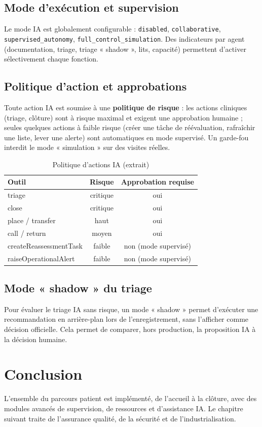 \subsection{Mode d'exécution et supervision}

Le mode IA est globalement configurable : \texttt{disabled}, \texttt{collaborative}, \texttt{supervised\_autonomy}, \texttt{full\_control\_simulation}. Des indicateurs par agent (documentation, triage, triage « shadow », lits, capacité) permettent d'activer sélectivement chaque fonction.

\subsection{Politique d'action et approbations}

Toute action IA est soumise à une \textbf{politique de risque} : les actions cliniques (triage, clôture) sont à risque maximal et exigent une approbation humaine ; seules quelques actions à faible risque (créer une tâche de réévaluation, rafraîchir une liste, lever une alerte) sont automatiques en mode supervisé. Un garde-fou interdit le mode « simulation » sur des visites réelles.

\begin{table}[H]
\centering
\caption{Politique d'actions IA (extrait)}
\label{tab:ai-actions}
\small
\begin{tabular}{|l|c|c|}
\hline
\textbf{Outil} & \textbf{Risque} & \textbf{Approbation requise} \\
\hline
triage & critique & oui \\
\hline
close & critique & oui \\
\hline
place / transfer & haut & oui \\
\hline
call / return & moyen & oui \\
\hline
createReassessmentTask & faible & non (mode supervisé) \\
\hline
raiseOperationalAlert & faible & non (mode supervisé) \\
\hline
\end{tabular}
\end{table}

\subsection{Mode « shadow » du triage}

Pour évaluer le triage IA sans risque, un mode « shadow » permet d'exécuter une recommandation en arrière-plan lors de l'enregistrement, sans l'afficher comme décision officielle. Cela permet de comparer, hors production, la proposition IA à la décision humaine.

\section{Conclusion}

L'ensemble du parcours patient est implémenté, de l'accueil à la clôture, avec des modules avancés de supervision, de ressources et d'assistance IA. Le chapitre suivant traite de l'assurance qualité, de la sécurité et de l'industrialisation.

